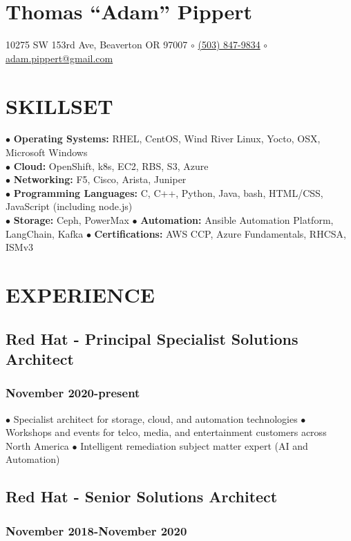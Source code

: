 \documentclass{article}
\begin{document}
\section*{Thomas ``Adam'' Pippert}
10275 SW 153rd Ave, Beaverton OR 97007 $\circ$
\href{tel:+15038479834}{(503) 847-9834} $\circ$
\href{mailto:adam.pippert@gmail.com}{adam.pippert@gmail.com}

\section*{SKILLSET}


$\bullet$ \textbf{Operating Systems:} RHEL, CentOS, Wind River Linux, Yocto, OSX, Microsoft Windows\\
$\bullet$ \textbf{Cloud:} OpenShift, k8s, EC2, RBS, S3, Azure\\
$\bullet$ \textbf{Networking:} F5, Cisco, Arista, Juniper\\
$\bullet$ \textbf{Programming Languages:} C, C++, Python, Java, bash, HTML/CSS, JavaScript (including node.js)\\
$\bullet$ \textbf{Storage:} Ceph, PowerMax
$\bullet$ \textbf{Automation:} Ansible Automation Platform, LangChain, Kafka
$\bullet$ \textbf{Certifications:} AWS CCP, Azure Fundamentals, RHCSA, ISMv3 


\section*{EXPERIENCE}

\subsection*{Red Hat - Principal Specialist Solutions Architect}
\subsubsection*{November 2020-present}

$\bullet$ Specialist architect for storage, cloud, and automation technologies 
$\bullet$ Workshops and events for telco, media, and entertainment customers across North America
$\bullet$ Intelligent remediation subject matter expert (AI and Automation)

\subsection*{Red Hat - Senior Solutions Architect}
\subsubsection*{November 2018-November 2020}
\end{document}
